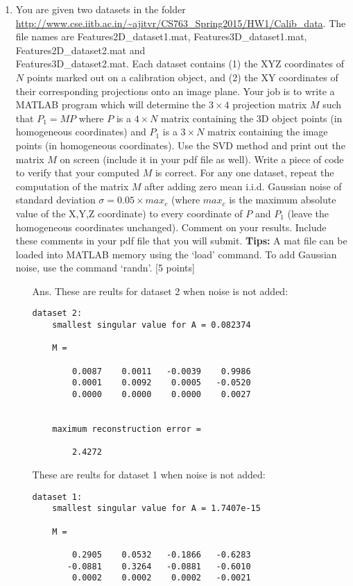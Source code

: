 \documentclass[11pt]{article}
\begin{document}
\begin{enumerate}
\item You are given two datasets in the folder \url{http://www.cse.iitb.ac.in/~ajitvr/CS763_Spring2015/HW1/Calib_data}. The file names are Features2D\_dataset1.mat, Features3D\_dataset1.mat, Features2D\_dataset2.mat and \\ Features3D\_dataset2.mat. Each dataset contains (1) the XYZ coordinates of $N$ points marked out on a calibration object, and (2) the XY coordinates of their corresponding projections onto an image plane. Your job is to write a MATLAB program which will determine the $3 \times 4$ projection matrix $M$ such that $P_1 = MP$ where $P$ is a $4 \times N$ matrix containing the 3D object points (in homogeneous coordinates) and $P_1$ is a $3 \times N$ matrix containing the image points (in homogeneous coordinates). Use the SVD method and print out the matrix $M$ on screen (include it in your pdf file as well). Write a piece of code to verify that your computed $M$ is correct. For any one dataset, repeat the computation of the matrix $M$ after adding zero mean i.i.d. Gaussian noise of standard deviation $\sigma = 0.05 \times max_c$ (where $max_c$ is the maximum absolute value of the X,Y,Z coordinate) to every coordinate of $P$ and $P_1$ (leave the homogeneous coordinates unchanged). Comment on your results. Include these comments in your pdf file that you will submit. \textbf{Tips:} A mat file can be loaded into MATLAB memory using the `load' command. To add Gaussian noise, use the command `randn'. \textsf{[5 points]}
\begin{itemize}
	\item[Ans.] 
	These are reults for dataset 2 when noise is not added:
	\begin{Verbatim}[frame=single]
	dataset 2: 
	smallest singular value for A = 0.082374

	M =

	    0.0087    0.0011   -0.0039    0.9986
	    0.0001    0.0092    0.0005   -0.0520
	    0.0000    0.0000    0.0000    0.0027


	maximum reconstruction error =

	    2.4272
	\end{Verbatim}

	These are reults for dataset 1 when noise is not added:
	\begin{Verbatim}[frame=single]
	dataset 1: 
	smallest singular value for A = 1.7407e-15

	M =

	    0.2905    0.0532   -0.1866   -0.6283
	   -0.0881    0.3264   -0.0881   -0.6010
	    0.0002    0.0002    0.0002   -0.0021



\end{Verbatim}
\end{itemize}
\end{enumerate}
\end{document}
